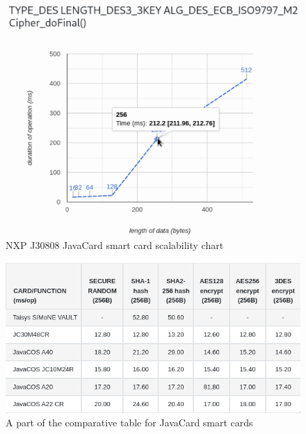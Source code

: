 \begin{figure}[H]
    \centering
    \includegraphics[width=\textwidth]{img/visualizations/NXP J3A080-scalability-DES3.png}
    \caption{NXP J30808 JavaCard smart card scalability chart}
\end{figure}

\begin{figure}[H]
    \centering
    \includegraphics[width=\textwidth]{img/visualizations/jc-comparative-table.png}
    \caption{A part of the comparative table for JavaCard smart cards}
    \label{fig:my_label}
\end{figure}




\renewcommand{\thechapter}{C}
